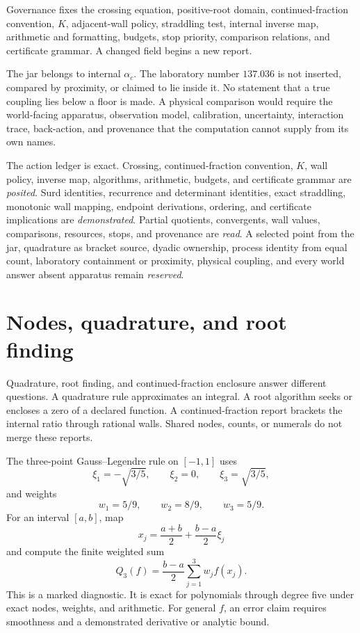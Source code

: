 Governance fixes the crossing equation, positive-root domain, continued-fraction convention, \(K\), adjacent-wall
policy, straddling test, internal inverse map, arithmetic and formatting, budgets, stop priority, comparison relations,
and certificate grammar.  A changed field begins a new report.

The jar belongs to internal \(\alpha_c\).  The laboratory number \(137.036\) is not inserted, compared by proximity,
or claimed to lie inside it.  No statement that a true coupling lies below a floor is made.  A physical comparison
would require the world-facing apparatus, observation model, calibration, uncertainty, interaction trace, back-action,
and provenance that the computation cannot supply from its own names.

The action ledger is exact.  Crossing, continued-fraction convention, \(K\), wall policy, inverse map, algorithms,
arithmetic, budgets, and certificate grammar are \emph{posited}.  Surd identities, recurrence and determinant
identities, exact straddling, monotonic wall mapping, endpoint derivations, ordering, and certificate implications are
\emph{demonstrated}.  Partial quotients, convergents, wall values, comparisons, resources, stops, and provenance are
\emph{read}.  A selected point from the jar, quadrature as bracket source, dyadic ownership, process identity from
equal count, laboratory containment or proximity, physical coupling, and every world answer absent apparatus remain
\emph{reserved}.
\section{Nodes, quadrature, and root finding}

Quadrature, root finding, and continued-fraction enclosure answer different questions.  A quadrature rule approximates
an integral.  A root algorithm seeks or encloses a zero of a declared function.  A continued-fraction report brackets
the internal ratio through rational walls.  Shared nodes, counts, or numerals do not merge these reports.

The three-point Gauss--Legendre rule on \([-1,1]\) uses
\[
\xi_1=-\sqrt{3/5},\qquad \xi_2=0,\qquad \xi_3=\sqrt{3/5},
\]
and weights
\[
                         w_1=5/9,\qquad w_2=8/9,\qquad w_3=5/9.
\]
For an interval \([a,b]\), map
\[
x_j=\frac{a+b}{2}+\frac{b-a}{2}\xi_j
\]
and compute the finite weighted sum
\[
Q_3(f)=\frac{b-a}{2}\sum_{j=1}^3w_jf(x_j).
\]
This is a marked diagnostic.  It is exact for polynomials through degree five under exact nodes, weights, and
arithmetic.  For general \(f\), an error claim requires smoothness and a demonstrated derivative or analytic bound.


